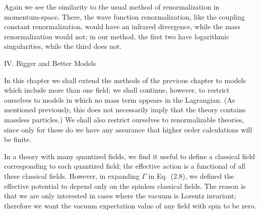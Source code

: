 \documentclass[12pt,epsf]{report}
\begin{document}
Again we see the similarity to the usual method of renormalization in
momentum-space.  There, the wave function renormalization, like the
coupling constant renormalization, would have an infrared divergence,
while the mass renormalization would not; in our method, the first two
have logarithmic singularities, while the third does not.

\vfill \eject

\centerline{IV. Bigger and Better Models}

\bigskip

In this chapter we shall extend the methods of the previous chapter to 
models which include more than one field; we shall continue, however, to
restrict ourselves to models in which no mass term appears in the 
Lagrangian.  (As mentioned previously, this does not necessarily imply
that the theory contains massless particles.)   We shall also restrict
ourselves to renormalizable theories, since only for these do we have
any assurance that higher order calculations will be finite.

In a theory with many quantized fields, we find it useful to define a
classical field corresponding to each quantized field; the effective
action is a functional of all these classical fields.  However, in
expanding $\Gamma$ in Eq.~(2.8), we defined the effective potential to
depend only on the spinless classical fields.  The reason is that we
are only interested in cases where the vacuum is Lorentz invariant;
therefore we want the vacuum expectation value of any field with spin
to be zero.
\end{document}
